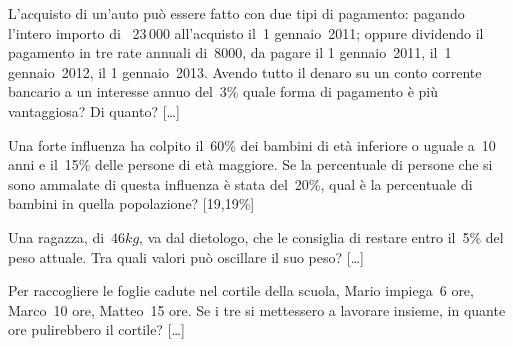 \begin{multicols}{2}
\begin{esercizio}
\label{ese:3.212}
L'acquisto di un'auto può essere fatto con due tipi di pagamento: pagando
l'intero importo di \officialeuro\ 23\,000 all'acquisto il~1{\textdegree} 
gennaio~2011; oppure
dividendo il pagamento in tre rate annuali di~8000, da pagare il
1{\textdegree} gennaio~2011, il~1{\textdegree} gennaio~2012, il
1{\textdegree} gennaio~2013. Avendo tutto il denaro su un conto
corrente bancario a un interesse annuo del~3\% quale forma di pagamento
è più vantaggiosa? Di quanto? \hfill [\dots]
\end{esercizio}

\begin{esercizio}
\label{ese:3.213}
Una forte influenza ha colpito il~60\% dei bambini di età
inferiore o uguale a~10 anni e il~15\% delle persone di età maggiore.
Se la percentuale di persone che si sono ammalate di questa influenza
è stata del~20\%, qual è la percentuale di bambini in quella
popolazione? \hfill [19,19\%]
\end{esercizio}


\begin{esercizio}
\label{ese:3.215}
 Una ragazza, di~$46\unit{kg}$, va dal dietologo, che
le consiglia di restare entro il~5\% del peso attuale. Tra
quali valori può oscillare il suo peso? \hfill [\dots]
\end{esercizio}

\begin{esercizio}
\label{ese:3.216}
Per raccogliere le foglie cadute nel cortile
della scuola, Mario impiega~6 ore, Marco~10 ore,
Matteo~15 ore. Se i tre si mettessero a lavorare
insieme, in quante ore pulirebbero il cortile? \hfill [\dots]
\end{esercizio}
% 
\end{multicols}
